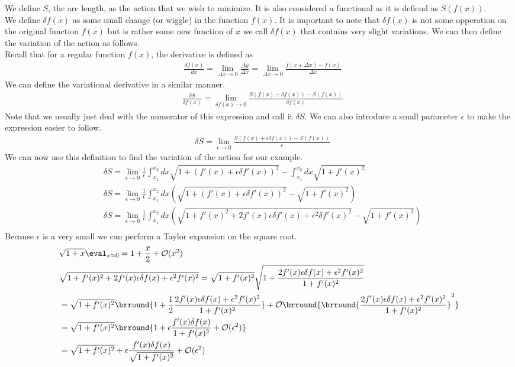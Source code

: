 We define $S$, the arc length, as the action that we wish to minimize. It is also considered a functional as it is defiend as $S(f(x))$.\\
We define $\delta f(x)$ as some small change (or wiggle) in the function $f(x)$. It is important to note that $\delta f(x)$ is not some opperation on the original function $f(x)$ but is rather some new function of $x$ we call $\delta f(x)$ that contains very slight variations. We can then define the variation of the action as follows.\\
Recall that for a regular function $f(x)$, the derivative is defined as
\begin{align*}
    &\frac{df(x)}{dx}=\lim_{\Delta x\to0}\frac{\Delta y}{\Delta x}=\lim_{\Delta x\to0}\frac{f(x+\Delta x)-f(x)}{\Delta x}
\end{align*}
We can define the variational derivative in a similar manner.
\begin{align*}
    &\frac{\delta S}{\delta f(x)}=\lim_{\delta f(x)\to0}\frac{S(f(x)+\delta f(x))-S(f(x))}{\delta f(x)}
\end{align*}
Note that we usually just deal with the numerator of this expression and call it $\delta S$. We can also introduce a small parameter $\epsilon$ to make the expression easier to follow.
\begin{align*}
    &\delta S=\lim_{\epsilon\to0} \frac{S(f(x)+\epsilon\delta f(x))-S(f(x))}{\epsilon}
\end{align*}
We can now use this definition to find the variation of the action for our example.
\begin{align*}
    &\delta S=\lim_{\epsilon\to0} \frac{1}{\epsilon}\int_{x_1}^{x_2}dx\sqrt{1+(f'(x)+\epsilon\delta f'(x))^2}-\int_{x_1}^{x_2}dx\sqrt{1+f'(x)^2}\\
    &\delta S=\lim_{\epsilon\to0} \frac{1}{\epsilon}\int_{x_1}^{x_2}dx\left(\sqrt{1+(f'(x)+\epsilon\delta f'(x))^2}-\sqrt{1+f'(x)^2}\right)\\
    &\delta S=\lim_{\epsilon\to0} \frac{1}{\epsilon}\int_{x_1}^{x_2}dx\left(\sqrt{1+f'(x)^2+2f'(x)\epsilon\delta f'(x)+\epsilon^2\delta f'(x)^2}-\sqrt{1+f'(x)^2}\right)\\
\end{align*}
Because $\epsilon$ is a very small we can perform a Taylor expansion on the square root.
\begin{align*}
    &\sqrt{1+x}\eval_{x\approx0}=1+\frac{x}{2}+\mathcal{O}(x^2)\\
    &\sqrt{1+f'(x)^2+2f'(x)\epsilon \delta f(x)+\epsilon^2f'(x)^2}=\sqrt{1+f'(x)^2}\sqrt{1+\frac{2f'(x)\epsilon \delta f(x)+\epsilon^2f'(x)^2}{1+f'(x)^2}}\\
    &=\sqrt{1+f'(x)^2}\brround{1+\frac{1}{2}\frac{2f'(x)\epsilon \delta f(x)+\epsilon^2f'(x)^2}{1+f'(x)^2}}+\mathcal{O}\brround{\brround{\frac{2f'(x)\epsilon \delta f(x)+\epsilon^2f'(x)^2}{1+f'(x)^2}}^2}\\
    &=\sqrt{1+f'(x)^2}\brround{1+\epsilon\frac{f'(x)\delta f(x)}{1+f'(x)^2}+\mathcal{O}(\epsilon^2)}\\
    &=\sqrt{1+f'(x)^2}+\epsilon\frac{f'(x)\delta f(x)}{\sqrt{1+f'(x)^2}}+\mathcal{O}(\epsilon^2)\\
\end{align*}
